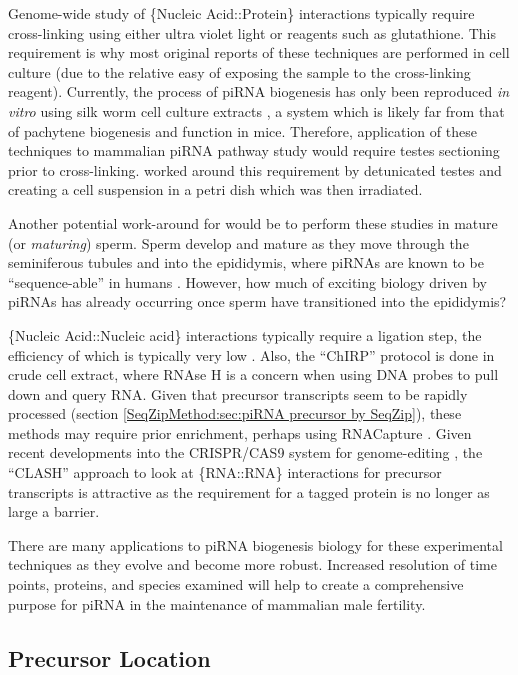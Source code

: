    Genome-wide study of \{Nucleic Acid::Protein\} interactions typically require cross-linking \citep{Chodosh2001} using either ultra violet light or reagents such as glutathione. This requirement is why most original reports of these techniques are performed in cell culture (due to the relative easy of exposing the sample to the cross-linking reagent). Currently, the process of piRNA biogenesis has only been reproduced \textit{in vitro} using silk worm cell culture extracts \citep{Kawaoka2009,Kawaoka2011}, a system which is likely far from that of pachytene biogenesis and function in mice. Therefore, application of these techniques to mammalian piRNA pathway study would require testes sectioning prior to cross-linking. \citep{Vourekas2012} worked around this requirement by detunicated testes and creating a cell suspension in a petri dish which was then irradiated.

    Another potential work-around for would be to perform these studies in mature (or \textit{maturing}) sperm. Sperm develop and mature as they move through the seminiferous tubules and into the epididymis, where piRNAs are known to be ``sequence-able'' in humans \citep{Jones1999,Li2012a}. However, how much of exciting biology driven by piRNAs has already occurring once sperm have transitioned into the epididymis?

    \{Nucleic Acid::Nucleic acid\} interactions typically require a ligation step, the efficiency of which is typically very low \citep{Helwak2014}. Also, the ``ChIRP'' protocol is done in crude cell extract, where RNAse H is a concern when using DNA probes to pull down and query RNA. Given that precursor transcripts seem to be rapidly processed (section \ref{SeqZipMethod:sec:piRNA precursor by SeqZip}), these methods may require prior enrichment, perhaps using RNACapture \citep{Mercer2014}. Given recent developments into the CRISPR/CAS9 system for genome-editing \citep{Sander2014}, the ``CLASH'' approach to look at \{RNA::RNA\} interactions for precursor transcripts is attractive as the requirement for a tagged protein is no longer as large a barrier.

    There are many applications to piRNA biogenesis biology for these experimental techniques as they evolve and become more robust. Increased resolution of time points, proteins, and species examined will help to create a comprehensive purpose for piRNA in the maintenance of mammalian male fertility.

  \subsection{Precursor Location}
    \label{Disc:subsec:Imaging of precursors}

